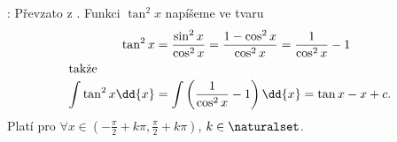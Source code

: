 \begin{mdframed}[style=mdmathsolution] 
  [\ref{mai:eq149}]: Převzato z \cite[s.~30]{Knichal}. Funkci \(\tan^2x\) napíšeme ve tvaru 
  \begin{align*}
    \tan^2x &= \frac{\sin^2x}{\cos^2x}=\frac{1-\cos^2x}{\cos^2x} = \frac{1}{\cos^2x}-1   \\
    \shortintertext{takže}
    \int{\tan^2x}\dd{x} &= \int\left(\frac{1}{\cos^2x}-1\right)\dd{x} = \tan x - x + c.  
  \end{align*}  
  Platí pro \(\forall x\in\left(-\frac{\pi}{2}+k\pi, \frac{\pi}{2}+k\pi\right)\),
  \(k\in\naturalset\).
\end{mdframed}